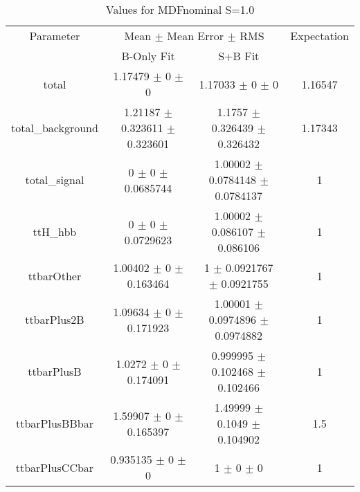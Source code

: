 \begin{table}
\centering
\caption{Values for MDFnominal S=1.0}
\begin{tabular}{cccc}
\toprule
Parameter & \multicolumn{2}{c}{Mean $\pm$ Mean Error $\pm$ RMS} & Expectation\\
 & B-Only Fit & S+B Fit & \\
\midrule
total & \num{1.17479} $\pm$ \num{0} $\pm$ \num{0} & \num{1.17033} $\pm$ \num{0} $\pm$ \num{0} & \num{1.16547}\\
total\_background & \num{1.21187} $\pm$ \num{0.323611} $\pm$ \num{0.323601} & \num{1.1757} $\pm$ \num{0.326439} $\pm$ \num{0.326432} & \num{1.17343}\\
total\_signal & \num{0} $\pm$ \num{0} $\pm$ \num{0.0685744} & \num{1.00002} $\pm$ \num{0.0784148} $\pm$ \num{0.0784137} & \num{1}\\
ttH\_hbb & \num{0} $\pm$ \num{0} $\pm$ \num{0.0729623} & \num{1.00002} $\pm$ \num{0.086107} $\pm$ \num{0.086106} & \num{1}\\
ttbarOther & \num{1.00402} $\pm$ \num{0} $\pm$ \num{0.163464} & \num{1} $\pm$ \num{0.0921767} $\pm$ \num{0.0921755} & \num{1}\\
ttbarPlus2B & \num{1.09634} $\pm$ \num{0} $\pm$ \num{0.171923} & \num{1.00001} $\pm$ \num{0.0974896} $\pm$ \num{0.0974882} & \num{1}\\
ttbarPlusB & \num{1.0272} $\pm$ \num{0} $\pm$ \num{0.174091} & \num{0.999995} $\pm$ \num{0.102468} $\pm$ \num{0.102466} & \num{1}\\
ttbarPlusBBbar & \num{1.59907} $\pm$ \num{0} $\pm$ \num{0.165397} & \num{1.49999} $\pm$ \num{0.1049} $\pm$ \num{0.104902} & \num{1.5}\\
ttbarPlusCCbar & \num{0.935135} $\pm$ \num{0} $\pm$ \num{0} & \num{1} $\pm$ \num{0} $\pm$ \num{0} & \num{1}\\
\bottomrule
\end{tabular}
\end{table}